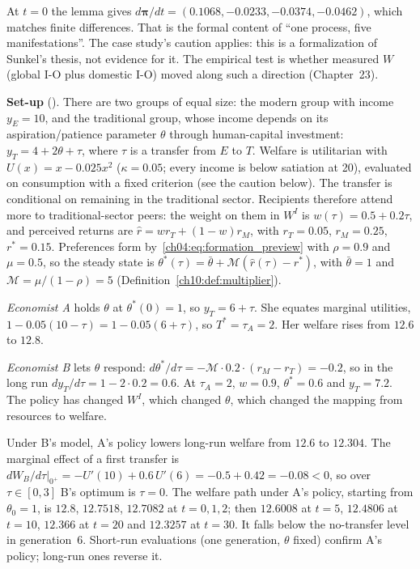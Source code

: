 \documentclass[../solutions_manual.tex]{subfiles}
\begin{document}
At $t = 0$ the lemma gives $d\boldsymbol\pi/dt = (0.1068, -0.0233, -0.0374, -0.0462)$, which matches finite differences. That is the formal content of ``one process, five manifestations''. The case study's caution applies: this is a formalization of Sunkel's thesis, not evidence for it. The empirical test is whether measured $W$ (global I-O plus domestic I-O) moved along such a direction (Chapter~23).


\textbf{Set-up} (\illustrative). There are two groups of equal size: the modern group with income $y_E = 10$, and the traditional group, whose income depends on its aspiration/patience parameter $\theta$ through human-capital investment: $y_T = 4 + 2\theta + \tau$, where $\tau$ is a transfer from $E$ to $T$. Welfare is utilitarian with $U(x) = x - 0.025x^2$ ($\kappa = 0.05$; every income is below satiation at 20), evaluated on consumption with a fixed criterion (see the caution below). The transfer is conditional on remaining in the traditional sector. Recipients therefore attend more to traditional-sector peers: the weight on them in $W^I$ is $w(\tau) = 0.5 + 0.2\tau$, and perceived returns are $\hat r = w r_T + (1-w)r_M$, with $r_T = 0.05$, $r_M = 0.25$, $r^* = 0.15$. Preferences form by~\eqref{ch04:eq:formation_preview} with $\rho = 0.9$ and $\mu = 0.5$, so the steady state is $\theta^*(\tau) = \bar\theta + \mathcal M(\hat r(\tau) - r^*)$, with $\bar\theta = 1$ and $\mathcal M = \mu/(1-\rho) = 5$ (Definition~\ref{ch10:def:multiplier}).

 \emph{Economist A} holds $\theta$ at $\theta^*(0) = 1$, so $y_T = 6 + \tau$. She equates marginal utilities, $1 - 0.05(10 - \tau) = 1 - 0.05(6 + \tau)$, so $T^* = \tau_A = 2$. Her welfare rises from $12.6$ to $12.8$.

 \emph{Economist B} lets $\theta$ respond: $d\theta^*/d\tau = -\mathcal M\cdot0.2\cdot(r_M - r_T) = -0.2$, so in the long run $dy_T/d\tau = 1 - 2\cdot0.2 = 0.6$. At $\tau_A = 2$, $w = 0.9$, $\theta^* = 0.6$ and $y_T = 7.2$. The policy has changed $W^I$, which changed $\theta$, which changed the mapping from resources to welfare.

 Under B's model, A's policy lowers long-run welfare from $12.6$ to $12.304$. The marginal effect of a first transfer is $dW_B/d\tau|_{0^+} = -U'(10) + 0.6\,U'(6) = -0.5 + 0.42 = -0.08 < 0$, so over $\tau \in [0,3]$ B's optimum is $\tau = 0$. The welfare path under A's policy, starting from $\theta_0 = 1$, is
$12.8$, $12.7518$, $12.7082$ at $t = 0, 1, 2$; then $12.6008$ at $t = 5$, $12.4806$ at $t = 10$, $12.366$ at $t = 20$ and $12.3257$ at $t = 30$.
It falls below the no-transfer level in generation~6. Short-run evaluations (one generation, $\theta$ fixed) confirm A's policy; long-run ones reverse it.
\end{document}
